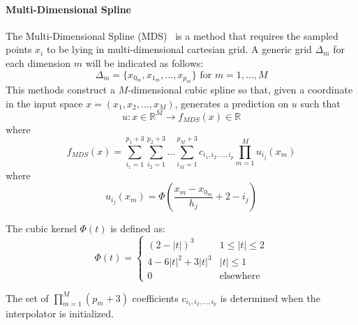 \paragraph{Multi-Dimensional Spline}
\label{sec:ND_spline}
The Multi-Dimensional Spline (MDS)~\cite{MD_spline} is a method that requires the sampled points $x_i$ to be lying in multi-dimensional cartesian grid.
A generic grid $\Delta_m$ for each dimension $m$ will be indicated as follows:
\begin{equation}
\Delta_m = \{x_{0_m},x_{1_m},\ldots,x_{p_m}\} \text{ for } m=1,\ldots,M
\end{equation}
This methods construct a $M$-dimensional cubic spline so that, given a coordinate in the input space $x=(x_1,x_2,\ldots,x_M)$, generates a prediction on $u$ such that
\begin{equation}
u:x \in \mathbb{R}^M \rightarrow f_{MDS}(x) \in \mathbb{R}
\end{equation}
where
\begin{equation}
f_{MDS}(x)=\sum_{i_1=1}^{p_1+3} \sum_{i_2=1}^{p_2+3} \ldots \sum_{i_M=1}^{p_M+3} c_{i_1,i_2,\ldots,i_p} \prod_{m=1}^{M} u_{i_j} (x_m)
\end{equation}
where
\begin{equation}
u_{i_j} (x_m) = \Phi\left ( \frac{x_m-x_{0_m}}{h_j}+2-i_j  \right )
\end{equation}

The cubic kernel $\Phi(t)$ is defined as:
\begin{equation}
\Phi(t) = \left\{\begin{matrix}
(2-\left | t \right |)^3 & 1\leq \left | t \right |\leq 2 \\
4-6\left | t \right |^2+3\left | t \right |^3 & \left | t \right |\leq 1\\
0 & \text{elsewhere}
\end{matrix}\right.
\end{equation}

The set of $\prod_{m=1}^{M}(p_m+3)$ coefficients $c_{i_1,i_2,\ldots,i_p}$  is determined when the interpolator is initialized.

